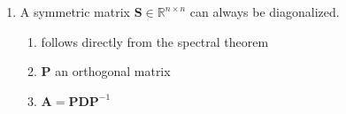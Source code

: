 \begin{enumerate}
    \item 
    \begin{theorem}
        A symmetric matrix $\bm{S} \in \mathbb{R}^{n\times n}$ can always be diagonalized.
        \hfill \cite{mfml/book/mml/Deisenroth-Faisal-Ong}
    \end{theorem}
    \begin{enumerate}
        \item follows directly from the spectral theorem
        \hfill \cite{mfml/book/mml/Deisenroth-Faisal-Ong}

        \item $\bm{P}$ an orthogonal matrix
        \hfill \cite{mfml/book/mml/Deisenroth-Faisal-Ong}

        \item $\bm{A} = \bm{PDP}^{-1}$
        \hfill \cite{mfml/book/mml/Deisenroth-Faisal-Ong}
    \end{enumerate}
\end{enumerate}







